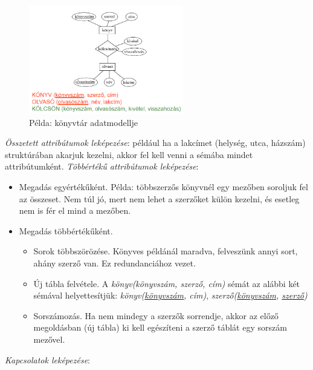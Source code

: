 \documentclass[margin=0px]{article}
\begin{document}
	\begin{figure}[H]
		\centering
		\includegraphics[width=0.6\textwidth]{img/ek7.png}
		\caption{Példa: könyvtár adatmodellje}
	\end{figure}
	\textit{Összetett attribútumok leképezése}: például ha a lakcímet (helység, utca, házszám) struktúrában akarjuk kezelni, akkor fel kell venni a sémába mindet attribútumként.
	\textit{Többértékű attribútumok leképezése}:
	\begin{itemize}
		\item Megadás egyértékűként. Példa: többszerzős könyvnél egy mezőben soroljuk fel az összeset. Nem túl jó, mert nem lehet a szerzőket külön kezelni, és esetleg nem is fér el mind a mezőben.
		\item Megadás többértékűként.
		\begin{itemize}
			\item Sorok többszörözése. Könyves példánál maradva, felveszünk annyi sort, ahány szerző van. Ez redundanciához vezet.
			\item Új tábla felvétele. A \textit{könyv(könyvszám, szerző, cím)} sémát az alábbi két sémával helyettesítjük: \textit{könyv(\underline{könyvszám}, cím)}, \textit{szerző(\underline{könyvszám}, \underline{szerző})}
			\item Sorszámozás. Ha nem mindegy a szerzők sorrendje, akkor az előző megoldásban (új tábla) ki kell egészíteni a szerző táblát egy sorszám mezővel.
		\end{itemize}
	\end{itemize}
	\textit{Kapcsolatok leképezése}:
\end{document}
